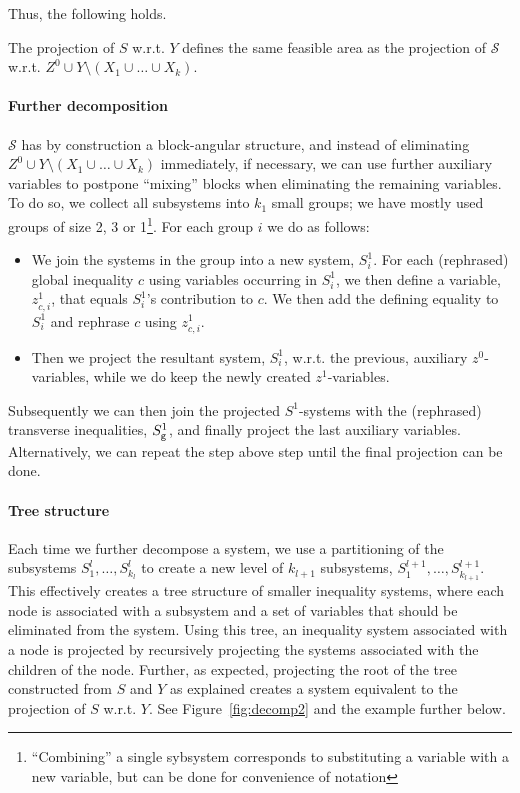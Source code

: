 Thus, the following holds. 
\begin{prop}
The projection of $S$ w.r.t. $Y$ defines the same feasible area as 
the projection of $\mathcal{S}$ w.r.t. $Z^0 \cup Y\setminus (X_1\cup \ldots \cup X_k)$.
\end{prop}

\paragraph{Further decomposition}
$\mathcal{S}$ has by construction a block-angular structure, and instead of eliminating $Z^0\cup Y\setminus(X_1\cup\ldots\cup X_k)$ immediately, if necessary, we can use further auxiliary variables to postpone ``mixing'' blocks when eliminating the remaining variables. 
To do so, we collect all subsystems into $k_1$ small groups; we have mostly used groups of size 2, 3 or 1\footnote{``Combining'' a single sybsystem corresponds to substituting a variable with a new variable, but can be done for convenience of notation}.
For each group $i$ we do as follows:
\begin{itemize}\itemsep0em
\item We join the systems in the group into a new system, $S^1_i$. For each (rephrased) global inequality $c$ using variables occurring in $S^1_i$, we then define a variable, $z^1_{c,i}$, that equals $S^1_i$'s contribution to $c$. We then add the defining equality to $S^1_i$ and rephrase $c$ using $z^1_{c,i}$.

\item Then we project the resultant system, $S^1_i$, w.r.t. the previous, auxiliary $z^0$-variables, while we do keep the newly created $z^1$-variables.
\end{itemize} 
Subsequently we can then join the projected $S^1$-systems with the (rephrased) transverse inequalities, $S_{\texttt{g}}^1$, and finally project the last auxiliary variables. Alternatively, we can repeat the step above step until the final projection can be done. 

\paragraph{Tree structure}
Each time we further decompose a system, we use a partitioning of the subsystems $S^l_1, \ldots, S^l_{k_l}$ to create a new level of $k_{l+1}$ subsystems, $S^{l+1}_1,\ldots, S^{l+1}_{k_{l+1}}$. This effectively creates a tree structure of smaller inequality systems, where each node is associated with a subsystem and a set of variables that should be eliminated from the system. 
Using this tree, an inequality system associated with a node is projected by recursively projecting the systems associated with the children of the node. Further, as expected, projecting the root of the tree constructed from $S$ and $Y$ as explained creates a system equivalent to the projection of $S$ w.r.t. $Y$. See Figure~\ref{fig:decomp2} and the example further below.

